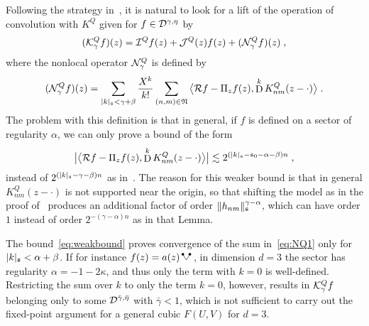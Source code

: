 \documentclass[reqno,11pt]{article}
\def\fraks{\mathfrak{s}}
\def\abss#1{\abs{#1}_\mathfrak{s}}
\DeclareMathOperator{\D}{D}            %
\newcommand{\setnm}{\mathfrak{N}}
\newcommand{\sumnm}{\sum_{(n,m)\in\setnm}}
\begin{document}
Following the strategy in~\cite[Section~5]{Hairer2014}, it is natural to
look for a lift of the operation of convolution with $K^Q$ given for
$f\in{\mathcal D}^{\gamma,\eta}$ by 
\begin{equation}
\label{eq:KQgamma_standard} 
 (\cK^Q_\gamma f)(z) = 
 \cI^Q f(z) + \cJ^Q(z) f(z) + (\cN^Q_\gamma f)(z)\;,
\end{equation} 
where the nonlocal operator ${\mathcal N}^Q_\gamma$ is defined by 
\begin{equation}
\label{eq:NQ1} 
 (\cN^Q_\gamma f)(z) 
 = \sum_{\abss{k} < \gamma+\beta} \frac{X^k}{k!} \sumnm
 \bigpscal{\cR f - \Pi_zf(z)}{\D^k K^Q_{nm}(z-\cdot)}\;.
\end{equation} 
The problem with this definition is that in general, if $f$ is defined on a
sector of regularity $\alpha$, we can only prove a bound of the form 
\begin{equation}
\label{eq:weakbound} 
 \bigabs{\bigpscal{\cR f - \Pi_zf(z)}{\D^k K^Q_{nm}(z-\cdot)}}
 \lesssim 2^{(\abss{k}-\fraks_0-\alpha-\beta)n}\;,
\end{equation} 
instead of $2^{(\abss{k}-\gamma-\beta)n}$ as
in~\cite[Eq.~(5.42)]{Hairer2014}. The reason for this weaker bound is that in
general $K^Q_{nm}(z-\cdot)$ is not supported near the origin, so that
shifting the model as in the proof of~\cite[Lem.~5.18]{Hairer2014} produces an
additional factor of order $\norm{h_{nm}}_\fraks^{\gamma-\alpha}$, which can
have order $1$ instead of order $2^{-(\gamma-\alpha)n}$ as in that Lemma.

The bound~\eqref{eq:weakbound} proves convergence of the sum in~\eqref{eq:NQ1}
only for $\abss{k} < \alpha + \beta$. If for instance $f(z) = a(z)\RSV$, in
dimension $d=3$ the sector has regularity $\alpha=-1-2\kappa$, and thus only the
term with $k=0$ is well-defined. Restricting the sum over $k$ to only the term
$k=0$, however, results in ${\mathcal K}^Q_\gamma f$ belonging only to some
${\mathcal D}^{\bar\gamma,\bar\eta}$ with $\bar\gamma < 1$, which is not sufficient to
carry out the fixed-point argument for a general cubic $F(U,V)$ 
for $d=3$.
\end{document}
